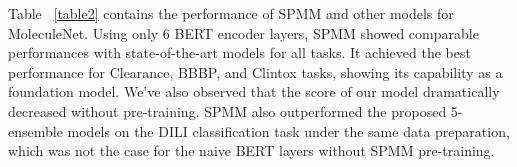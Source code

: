 \documentclass{nature_meth}
\newcommand{\1}{\blmath{1}}
\newcommand{\0}{\blmath{0}}
\begin{document}
Table ~\ref{table2} contains the performance of SPMM and other models for MoleculeNet. Using only 6 BERT encoder layers, SPMM showed comparable performances with state-of-the-art models for all tasks. It achieved the best performance for Clearance, BBBP, and Clintox tasks, showing its capability as a foundation model. We've also observed that the score of our model dramatically decreased without pre-training. SPMM also outperformed the proposed 5-ensemble models on the DILI classification task under the same data preparation, which was not the case for the naive BERT layers without SPMM pre-training. 


\begin{table}[!hbt]
\centering
{}
\end{table}
\end{document}
